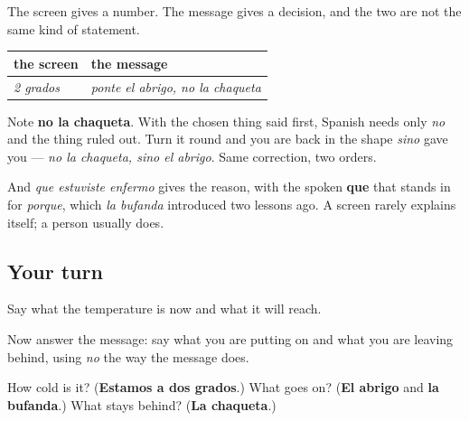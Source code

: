 \begin{grammarlens}[title={Grammar Lens: what the message is doing that the screen cannot}]
The screen gives a number. The message gives a decision, and the two are not the same kind of statement.

\noindent
\begin{tabularx}{\linewidth}{@{}>{\raggedright\arraybackslash}X>{\raggedright\arraybackslash}X@{}}
\toprule
\textbf{the screen} & \textbf{the message} \\
\midrule
\emph{2 grados} & \emph{ponte el abrigo, no la chaqueta} \\
\bottomrule
\end{tabularx}

Note \textbf{no la chaqueta}. With the chosen thing said first, Spanish needs only \emph{no} and the thing ruled out. Turn it round and you are back in the shape \emph{sino} gave you — \emph{no la chaqueta, sino el abrigo}. Same correction, two orders.

And \emph{que estuviste enfermo} gives the reason, with the spoken \textbf{que} that stands in for \emph{porque}, which \emph{la bufanda} introduced two lessons ago. A screen rarely explains itself; a person usually does.
\end{grammarlens}

\subsection*{Your turn}
Say what the temperature is now and what it will reach.

Now answer the message: say what you are putting on and what you are leaving behind, using \emph{no} the way the message does.

\begin{tcolorbox}[breakable,colback=teal!4,colframe=teal!35!black,title={Before you move on}]
How cold is it? (\textbf{Estamos a dos grados}.) What goes on? (\textbf{El abrigo} and \textbf{la bufanda}.) What stays behind? (\textbf{La chaqueta}.)
\end{tcolorbox}
